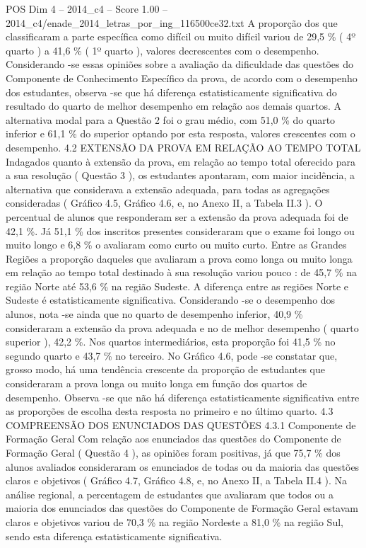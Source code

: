 \begin{textsample}{POS Dim 4 – 2014\_c4 – Score 1.00 – 2014\_c4/enade\_2014\_letras\_por\_ing\_116500ce32.txt}
A proporção dos que classificaram a parte específica como difícil ou muito difícil variou de 29,5 \% ( 4º quarto ) a 41,6 \% ( 1º quarto ), valores decrescentes com o desempenho.
Considerando -se essas opiniões sobre a avaliação da dificuldade das questões do Componente de Conhecimento Específico da prova, de acordo com o desempenho dos estudantes, observa -se que há diferença estatisticamente significativa do resultado do quarto de melhor desempenho em relação aos demais quartos.
A alternativa modal para a Questão 2 foi o grau médio, com 51,0 \% do quarto inferior e 61,1 \% do superior optando por esta resposta, valores crescentes com o desempenho. 4.2 EXTENSÃO DA PROVA EM RELAÇÃO AO TEMPO TOTAL Indagados quanto à extensão da prova, em relação ao tempo total oferecido para a sua resolução ( Questão 3 ), os estudantes apontaram, com maior incidência, a alternativa que considerava a extensão adequada, para todas as agregações consideradas ( Gráfico 4.5, Gráfico 4.6, e, no Anexo II, a Tabela II.3 ).
O percentual de alunos que responderam ser a extensão da prova adequada foi de 42,1 \%.
Já 51,1 \% dos inscritos presentes consideraram que o exame foi longo ou muito longo e 6,8 \% o avaliaram como curto ou muito curto.
Entre as Grandes Regiões a proporção daqueles que avaliaram a prova como longa ou muito longa em relação ao tempo total destinado à sua resolução variou pouco : de 45,7 \% na região Norte até 53,6 \% na região Sudeste.
A diferença entre as regiões Norte e Sudeste é estatisticamente significativa.
Considerando -se o desempenho dos alunos, nota -se ainda que no quarto de desempenho inferior, 40,9 \% consideraram a extensão da prova adequada e no de melhor desempenho ( quarto superior ), 42,2 \%.
Nos quartos intermediários, esta proporção foi 41,5 \% no segundo quarto e 43,7 \% no terceiro.
No Gráfico 4.6, pode -se constatar que, grosso modo, há uma tendência crescente da proporção de estudantes que consideraram a prova longa ou muito longa em função dos quartos de desempenho.
Observa -se que não há diferença estatisticamente significativa entre as proporções de escolha desta resposta no primeiro e no último quarto. 4.3 COMPREENSÃO DOS ENUNCIADOS DAS QUESTÕES 4.3.1 Componente de Formação Geral Com relação aos enunciados das questões do Componente de Formação Geral ( Questão 4 ), as opiniões foram positivas, já que 75,7 \% dos alunos avaliados consideraram os enunciados de todas ou da maioria das questões claros e objetivos ( Gráfico 4.7, Gráfico 4.8, e, no Anexo II, a Tabela II.4 ).
Na análise regional, a percentagem de estudantes que avaliaram que todos ou a maioria dos enunciados das questões do Componente de Formação Geral estavam claros e objetivos variou de 70,3 \% na região Nordeste a 81,0 \% na região Sul, sendo esta diferença estatisticamente significativa.

\end{textsample}
